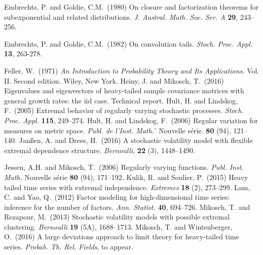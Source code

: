 \documentclass[leqno,10pt]{amsart}
\newcommand{\1}{{\bf 1}}
\newcommand{\8}{\infty}
\newcommand{\fct}{function}
\newcommand{\ms}{measure}
\begin{document}
\begin{thebibliography}{99}
 {\sc Embrechts, P. and Goldie, C.M.}\ (1980) On closure and factorization theorems for subexponential
 and related distributions. {\em J. Austral. Math. Soc. Ser. A } {\bf29}, 243--256.
 
 {\sc Embrechts, P. and Goldie, C.M.}\ (1982) On convolution tails. {\em Stoch. Proc. Appl.} {\bf 13}, 263-278.

{\sc Feller, W.}\ (1971)
{\em An Introduction to Probability Theory and Its Applications.}
Vol. II. Second edition. Wiley, New York.
{\sc Heiny, J. and Mikosch, T.}\ (2016)
Eigenvalues and eigenvectors of heavy-tailed sample covariance matrices with general growth rates: the iid case.
Technical report.
{\sc Hult, H. and Lindskog, F.}\ (2005)
Extremal behavior of regularly varying stochastic processes.  
{\em Stoch. Proc. Appl.} {\bf  115}, 249--274.
{\sc Hult, H. and Lindskog, F.}\ (2006)
Regular variation for \ms s on metric space.
{\em Publ. de l'Inst. Math.}                                           ́
Nouvelle s\'erie. {\bf 80} (94), 121--140.
{\sc Jan\ss en, A. and Drees, H.}\ (2016)
A stochastic volatility model with flexible extremal dependence structure. {\em Bernoulli}, {\bf 22} (3), 1448--1490.

{\sc Jessen, A.H. and Mikosch, T.}\ (2006)
Regularly varying \fct s. {\em Publ. Inst. Math.} {Nouvelle s\'erie}
{\bf 80} (94), 171--192.
{\sc Kulik, R. and Soulier, P.}\ (2015) 
Heavy tailed time series with extremal independence. {\em Extremes} {\bf 18} (2), 273--299.
{\sc Lam, C. and Yao, Q.}\ (2012)
Factor modeling for high-dimensional time series: inference
              for the number of factors. {\em Ann. Statist.} {\bf 40}, 694--726.
{\sc Mikosch, T. and Rezapour, M.}\ (2013) Stochastic volatility models with possible
extremal clustering. {\em Bernoulli} {\bf 19} (5A), 1688--1713.
{\sc Mikosch, T. and Wintenberger, O.}\ (2016)
A large deviations approach to limit theory for heavy-tailed time series. {\em Probab. Th. Rel. Fields}, to appear.



\end{thebibliography}
\end{document}
